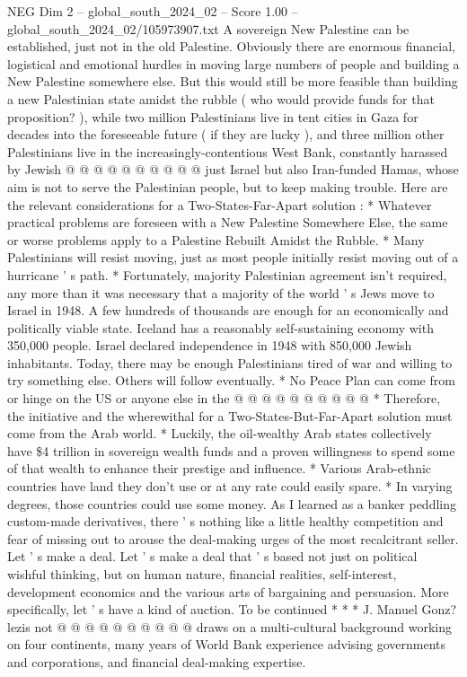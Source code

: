 \begin{textsample}{NEG Dim 2 – global\_south\_2024\_02 – Score 1.00 – global\_south\_2024\_02/105973907.txt}
A sovereign New Palestine can be established, just not in the old Palestine.
Obviously there are enormous financial, logistical and emotional hurdles in moving large numbers of people and building a New Palestine somewhere else.
But this would still be more feasible than building a new Palestinian state amidst the rubble ( who would provide funds for that proposition? ), while two million Palestinians live in tent cities in Gaza for decades into the foreseeable future ( if they are lucky ), and three million other Palestinians live in the increasingly-contentious West Bank, constantly harassed by Jewish @ @ @ @ @ @ @ @ @ @ just Israel but also Iran-funded Hamas, whose aim is not to serve the Palestinian people, but to keep making trouble.
Here are the relevant considerations for a Two-States-Far-Apart solution : * Whatever practical problems are foreseen with a New Palestine Somewhere Else, the same or worse problems apply to a Palestine Rebuilt Amidst the Rubble. * Many Palestinians will resist moving, just as most people initially resist moving out of a hurricane ' s path. * Fortunately, majority Palestinian agreement isn't required, any more than it was necessary that a majority of the world ' s Jews move to Israel in 1948.
A few hundreds of thousands are enough for an economically and politically viable state.
Iceland has a reasonably self-sustaining economy with 350,000 people.
Israel declared independence in 1948 with 850,000 Jewish inhabitants.
Today, there may be enough Palestinians tired of war and willing to try something else.
Others will follow eventually. * No Peace Plan can come from or hinge on the US or anyone else in the @ @ @ @ @ @ @ @ @ @ * Therefore, the initiative and the wherewithal for a Two-States-But-Far-Apart solution must come from the Arab world. * Luckily, the oil-wealthy Arab states collectively have \$4 trillion in sovereign wealth funds and a proven willingness to spend some of that wealth to enhance their prestige and influence. * Various Arab-ethnic countries have land they don't use or at any rate could easily spare. * In varying degrees, those countries could use some money.
As I learned as a banker peddling custom-made derivatives, there ' s nothing like a little healthy competition and fear of missing out to arouse the deal-making urges of the most recalcitrant seller.
Let ' s make a deal.
Let ' s make a deal that ' s based not just on political wishful thinking, but on human nature, financial realities, self-interest, development economics and the various arts of bargaining and persuasion.
More specifically, let ' s have a kind of auction.
To be continued * * * J.
Manuel Gonz? lezis not @ @ @ @ @ @ @ @ @ @ draws on a multi-cultural background working on four continents, many years of World Bank experience advising governments and corporations, and financial deal-making expertise.

\end{textsample}
